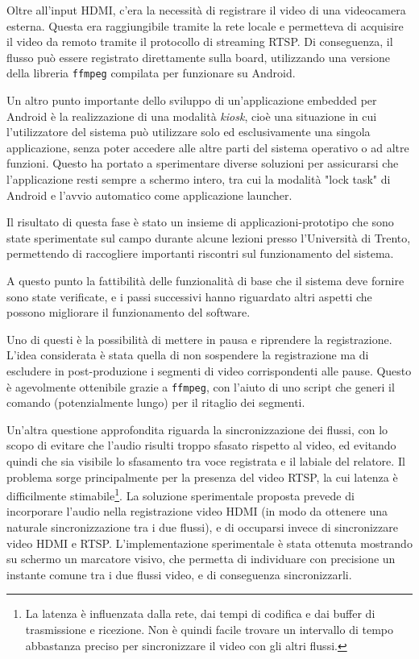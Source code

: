 Oltre all'input HDMI, c'era la necessità di registrare il video di una videocamera esterna. Questa era raggiungibile tramite la rete locale e permetteva di acquisire il video da remoto tramite il protocollo di streaming RTSP. Di conseguenza, il flusso può essere registrato direttamente sulla board, utilizzando una versione della libreria \texttt{ffmpeg} compilata per funzionare su Android.

Un altro punto importante dello sviluppo di un'applicazione embedded per Android è la realizzazione di una modalità \textit{kiosk}, cioè una situazione in cui l'utilizzatore del sistema può utilizzare solo ed esclusivamente una singola applicazione, senza poter accedere alle altre parti del sistema operativo o ad altre funzioni. Questo ha portato a sperimentare diverse soluzioni per assicurarsi che l'applicazione resti sempre a schermo intero, tra cui la modalità "lock task" di Android e l'avvio automatico come applicazione launcher.

Il risultato di questa fase è stato un insieme di applicazioni-prototipo che sono state sperimentate sul campo durante alcune lezioni presso l'Università di Trento, permettendo di raccogliere importanti riscontri sul funzionamento del sistema.

A questo punto la fattibilità delle funzionalità di base che il sistema deve fornire sono state verificate, e i passi successivi hanno riguardato altri aspetti che possono migliorare il funzionamento del software.

Uno di questi è la possibilità di mettere in pausa e riprendere la registrazione. L'idea considerata è stata quella di non sospendere la registrazione ma di escludere in post-produzione i segmenti di video corrispondenti alle pause. Questo è agevolmente ottenibile grazie a \texttt{ffmpeg}, con l'aiuto di uno script che generi il comando (potenzialmente lungo) per il ritaglio dei segmenti.

Un'altra questione approfondita riguarda la sincronizzazione dei flussi, con lo scopo di evitare che l'audio risulti troppo sfasato rispetto al video, ed evitando quindi che sia visibile lo sfasamento tra voce registrata e il labiale del relatore. Il problema sorge principalmente per la presenza del video RTSP, la cui latenza è difficilmente stimabile\footnote{La latenza è influenzata dalla rete, dai tempi di codifica e dai buffer di trasmissione e ricezione. Non è quindi facile trovare un intervallo di tempo abbastanza preciso per sincronizzare il video con gli altri flussi.}. La soluzione sperimentale proposta prevede di incorporare l'audio nella registrazione video HDMI (in modo da ottenere una naturale sincronizzazione tra i due flussi), e di occuparsi invece di sincronizzare video HDMI e RTSP. L'implementazione sperimentale è stata ottenuta mostrando su schermo un marcatore visivo, che permetta di individuare con precisione un instante comune tra i due flussi video, e di conseguenza sincronizzarli.

